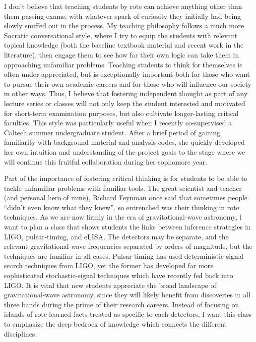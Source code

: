 \documentclass[11pt,letterpaper,sans]{moderncv} %
\begin{document}
I don't believe that teaching students by rote can achieve anything other than them passing exams, with whatever spark of curiosity they initially had being slowly snuffed out in the process. My teaching philosophy follows a much more Socratic conversational style, where I try to equip the students with relevant topical knowledge (both the baseline textbook material and recent work in the literature), then engage them to see how far their own logic can take them in approaching unfamiliar problems. Teaching students to think for themselves is often under-appreciated, but is exceptionally important both for those who want to pursue their own academic careers and for those who will influence our society in other ways. Thus, I believe that fostering independent thought as part of any lecture series or classes will not only keep the student interested and motivated for short-term examination purposes, but also cultivate longer-lasting critical faculties. This style was particularly useful when I recently co-supervised a Caltech summer undergraduate student. After a brief period of gaining familiarity with background material and analysis codes, she quickly developed her own intuition and understanding of the project goals to the stage where we will continue this fruitful collaboration during her sophomore year.
\vspace{2mm}

Part of the importance of fostering critical thinking is for students to be able to tackle unfamiliar problems with familiar tools. The great scientist and teacher (and personal hero of mine), Richard Feynman once said that sometimes people ``didn't even know what they knew'', so entrenched was their thinking in rote techniques. As we are now firmly in the era of gravitational-wave astronomy, I want to plan a class that shows students the links between inference strategies in LIGO, pulsar-timing, and eLISA. The detectors may be separate, and the relevant gravitational-wave frequencies separated by orders of magnitude, but the techniques are familiar in all cases. Pulsar-timing has used deterministic-signal search techniques from LIGO, yet the former has developed far more sophisticated stochastic-signal techniques which have recently fed back into LIGO. It is vital that new students appreciate the broad landscape of gravitational-wave astronomy, since they will likely benefit from discoveries in all three bands during the prime of their research careers. Instead of focusing on islands of rote-learned facts treated as specific to each detectors, I want this class to emphasize the deep bedrock of knowledge which connects the different disciplines. 
\vspace{2mm}
\end{document}
